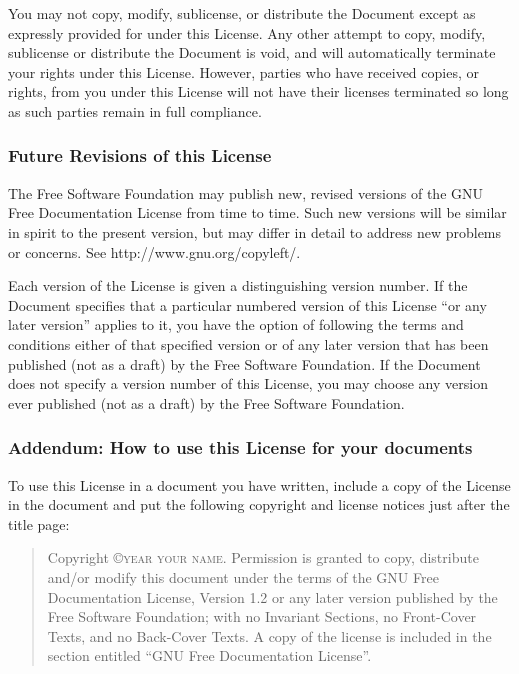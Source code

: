 You may not copy, modify, sublicense, or distribute the Document except as expressly provided for under this License. Any other attempt to copy, modify, sublicense or distribute the Document is void, and will automatically terminate your rights under this License. However, parties who have received copies, or rights, from you under this License will not have their licenses terminated so long as such parties remain in full compliance.

\subsubsection{Future Revisions of this License}

The Free Software Foundation may publish new, revised versions of the GNU Free Documentation License from time to time. Such new versions will be similar in spirit to the present version, but may differ in detail to address new problems or concerns. See http://www.gnu.org/copyleft/.

Each version of the License is given a distinguishing version number. If the Document specifies that a particular numbered version of this License ``or any later version'' applies to it, you have the option of following the terms and conditions either of that specified version or of any later version that has been published (not as a draft) by the Free Software Foundation. If the Document does not specify a version number of this License, you may choose any version ever published (not as a draft) by the Free Software Foundation.

\subsubsection{Addendum: How to use this License for your documents}

To use this License in a document you have written, include a copy of the License in the document and put the following copyright and license notices just after the title page:

\bigskip
\begin{quote}
  Copyright \copyright \textsc{year your name}. Permission is granted to copy, distribute and/or modify this document under the terms of the GNU Free Documentation License, Version 1.2 or any later version published by the Free Software Foundation; with no Invariant Sections, no Front-Cover Texts, and no Back-Cover Texts. A copy of the license is included in the section entitled ``GNU Free Documentation License''.
\end{quote}
\bigskip

